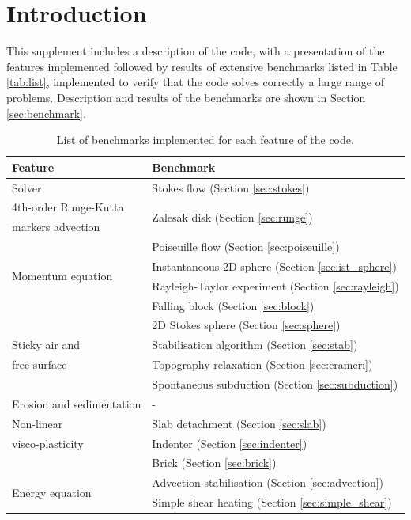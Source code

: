\documentclass[hidelinks,10pt,a4paper]{article}
\begin{document}
\section{Introduction}\label{sec:intro}
This supplement includes a description of the code, with a presentation of the features implemented followed by results of extensive benchmarks listed in
Table \ref{tab:list}, implemented to verify that the code solves correctly a large range of problems. Description and results of the benchmarks are shown
in Section \ref{sec:benchmark}.

\begin{table}[H]
\caption{List of benchmarks implemented for each feature of the code.}
\centering
\begin{tabular}{| l | l |}
\toprule
 \textbf{Feature}  & \textbf{Benchmark}  \\
\midrule
  Solver  & Stokes flow (Section \ref{sec:stokes})  \\
\hline
  4th-order Runge-Kutta  & \multirow{2}{*}{Zalesak disk (Section \ref{sec:runge})} \\
  markers advection  &  \\
\hline
  \multirow{4}{*}{Momentum equation}  & Poiseuille flow (Section \ref{sec:poiseuille}) \\
    & Instantaneous 2D sphere (Section \ref{sec:ist_sphere})   \\
    & Rayleigh-Taylor experiment (Section \ref{sec:rayleigh})  \\
    & Falling block (Section \ref{sec:block})  \\
\hline
    & 2D Stokes sphere (Section \ref{sec:sphere}) \\
    Sticky air and  & Stabilisation algorithm (Section \ref{sec:stab})   \\
    free surface & Topography relaxation (Section \ref{sec:crameri})   \\
  & Spontaneous subduction (Section \ref{sec:subduction})   \\
\hline
  Erosion and sedimentation  & -  \\
\hline
   Non-linear  & Slab detachment (Section \ref{sec:slab})   \\
   visco-plasticity & Indenter (Section \ref{sec:indenter})   \\
    & Brick (Section \ref{sec:brick})   \\
\hline
  \multirow{5}{*}{Energy equation}  & Advection stabilisation (Section \ref{sec:advection})   \\
    & Simple shear heating (Section \ref{sec:simple_shear}) \\

\end{tabular}
\end{table}
\end{document}
